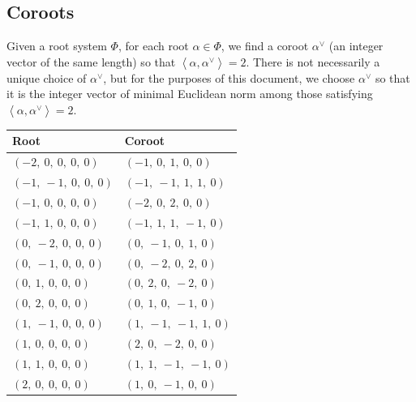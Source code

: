 \documentclass[11pt]{article}
\newcommand{\la}{\left\langle}
\newcommand{\ra}{\right\rangle}
\theoremstyle{definition}
\begin{document}
\subsection{Coroots}

Given a root system $\Phi$, for each root $\alpha \in \Phi$, we find a coroot $\alpha^\vee$ (an integer vector of the same length) so that $\la \alpha, \alpha^\vee \ra = 2$. There is not necessarily a unique choice of $\alpha^\vee$, but for the purposes of this document, we choose $\alpha^\vee$ so that it is the integer vector of minimal Euclidean norm among those satisfying $\la \alpha, \alpha^\vee \ra = 2$.

\bigskip

\noindent \begin{tabular}{|l|l|}
    \hline
    \textbf{Root} & \textbf{Coroot} \\
    \hline
    $\left( -2, \  0, \  0, \  0, \  0\right)$ & $\left( -1, \  0, \  1, \  0, \  0\right)$ \\
    \hline
    $\left( -1, \  -1, \  0, \  0, \  0\right)$ & $\left( -1, \  -1, \  1, \  1, \  0\right)$ \\
    \hline
    $\left( -1, \  0, \  0, \  0, \  0\right)$ & $\left( -2, \  0, \  2, \  0, \  0\right)$ \\
    \hline
    $\left( -1, \  1, \  0, \  0, \  0\right)$ & $\left( -1, \  1, \  1, \  -1, \  0\right)$ \\
    \hline
    $\left( 0, \  -2, \  0, \  0, \  0\right)$ & $\left( 0, \  -1, \  0, \  1, \  0\right)$ \\
    \hline
    $\left( 0, \  -1, \  0, \  0, \  0\right)$ & $\left( 0, \  -2, \  0, \  2, \  0\right)$ \\
    \hline
    $\left( 0, \  1, \  0, \  0, \  0\right)$ & $\left( 0, \  2, \  0, \  -2, \  0\right)$ \\
    \hline
    $\left( 0, \  2, \  0, \  0, \  0\right)$ & $\left( 0, \  1, \  0, \  -1, \  0\right)$ \\
    \hline
    $\left( 1, \  -1, \  0, \  0, \  0\right)$ & $\left( 1, \  -1, \  -1, \  1, \  0\right)$ \\
    \hline
    $\left( 1, \  0, \  0, \  0, \  0\right)$ & $\left( 2, \  0, \  -2, \  0, \  0\right)$ \\
    \hline
    $\left( 1, \  1, \  0, \  0, \  0\right)$ & $\left( 1, \  1, \  -1, \  -1, \  0\right)$ \\
    \hline
    $\left( 2, \  0, \  0, \  0, \  0\right)$ & $\left( 1, \  0, \  -1, \  0, \  0\right)$ \\
    \hline
\end{tabular}
\end{document}
